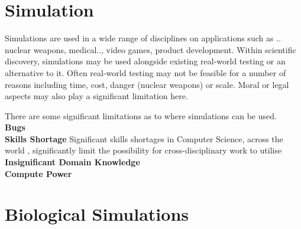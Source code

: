 \documentclass{UoYCSproject}
\begin{document}

\section{Simulation}
Simulations are used in a wide range of disciplines on applications such as .. nuclear weapons, medical.., video games, product development.
Within scientific discovery, simulations may be used alongside existing real-world testing or an alternative to it. Often real-world testing may not be feasible for a number of reasons including time, cost, danger (nuclear weapons) or scale. Moral or legal aspects may also play a significant limitation here. %




There are some significant limitations as to where simulations can be used.
\\
\textbf{Bugs}
\\

\textbf{Skills Shortage}
\label{skills_shortage}
Significant skills shortages in Computer Science, across the world%
, significantly limit the possibility for cross-disciplinary work to utilise 
\\

\textbf{Insignificant Domain Knowledge}
\\

\textbf{Compute Power}


\section{Biological Simulations}
\end{document}
